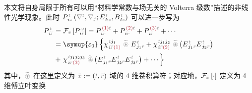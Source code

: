 本文将自身局限于所有可以用“材料学常数与场无关的 Volterra 级数\cite{pintoExactVolterraseriesComputation1982,shenNonlinearOpticalSusceptibilities2001}”描述的非线性光学现象。此时 $P^{\;\!\mathcolor{gray}{t}}_{\;\! i\mathcolor{gray}{z}} \left( \mathcolor{gray}{\nabla^t}, \mathcolor{gray}{\nabla_j} ; E^{\;\!\mathcolor{gray}{t}}_{\;\! k\mathcolor{gray}{z}}, B^{\;\!\mathcolor{gray}{t}}_{\;\! l\mathcolor{gray}{z}} \right)$ 可以进一步写为\cite{teixeiraOpticalTransmissionModeling2013,andreasczylwikNonlinearSystemModeling1986,shenNonlinearOpticalSusceptibilities2001,zalevskyOpticalImplementationSecondorder2001,zhangNonlinearQuantumInputoutput2014}
\begin{subequations} \label{P_barx_nonlinear}
\begin{align}
	P^{\;\!\mathcolor{gray}{t}}_{\;\! i\mathcolor{gray}{\bar{r}}} &= \mathcal F_{\mathcolor{gray}{\bar{x}}} \left[ P^{\;\! \mathcolor{gray}{\omega}}_{\;\! i\mathcolor{gray}{\bar{r}}} \right] = P^{\;\! \textcolor{Maroon}{(1)} \mathcolor{gray}{t}}_{\;\! i\mathcolor{gray}{\bar{r}}} + P^{\;\! \textcolor{Maroon}{(2)} \mathcolor{gray}{t}}_{\;\! i\mathcolor{gray}{\bar{r}}} + P^{\;\! \textcolor{Maroon}{(3)} \mathcolor{gray}{t}}_{\;\! i\mathcolor{gray}{\bar{r}}} + \cdots \\ &= {\symup{\varepsilon_0}} \left\{ \chi^{\;\! \mathcolor{gray}{t} j_1}_{\;\! i \mathcolor{gray}{\bar{r}} \textcolor{Maroon}{(1)}} ~\mathcolor{gray}{\widetilde \circledast}~ E^{\;\!\mathcolor{gray}{t}}_{\;\! j_1 \mathcolor{gray}{\bar{r}}} + \chi^{\;\! \mathcolor{gray}{t} j_1 j_2}_{\;\! i \mathcolor{gray}{\bar{r}} \textcolor{Maroon}{(2)}}~\mathcolor{gray}{\widetilde \circledast}\left( E^{\;\!\mathcolor{gray}{t}}_{\;\! j_1 \mathcolor{gray}{\bar{r}}} E^{\;\!\mathcolor{gray}{t}}_{\;\! j_2 \mathcolor{gray}{\bar{r}}} \right) \right. \\ &+ \left. \chi^{\;\! \mathcolor{gray}{t} j_1 j_2 j_3}_{\;\! i \mathcolor{gray}{\bar{r}} \textcolor{Maroon}{(3)}}~\mathcolor{gray}{\widetilde \circledast}\left( E^{\;\!\mathcolor{gray}{t}}_{\;\! j_1 \mathcolor{gray}{\bar{r}}} E^{\;\!\mathcolor{gray}{t}}_{\;\! j_2 \mathcolor{gray}{\bar{r}}} E^{\;\!\mathcolor{gray}{t}}_{\;\! j_3 \mathcolor{gray}{\bar{r}}} \right) + \cdots \right\}
\end{align}
\end{subequations}
其中，$\mathcolor{gray}{\widetilde \circledast}$ 在这里定义为 $\mathcolor{gray}{\bar{x}} := \left( \mathcolor{gray}{t}, \mathcolor{gray}{\bar{r}} \right)$ 域的 4 维卷积算符；对应地，$\mathcal F_{\mathcolor{gray}{\bar{x}}} \left[ \cdot \right]$ 定义为 4 维傅立叶变换

